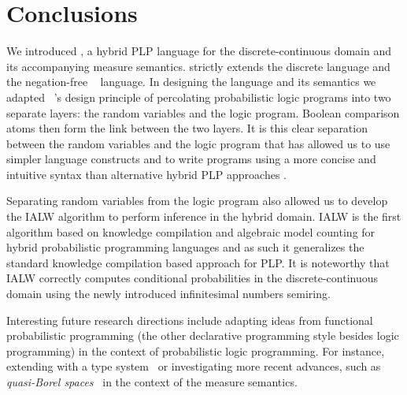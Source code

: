 \section{Conclusions}\label{sec:conclusions}


We introduced \dcproblogsty, a hybrid PLP language for the discrete-continuous domain and its accompanying measure semantics.
\dcproblogsty strictly extends the discrete \problogsty language \citep{de2007problog,fierens2015inference} and the negation-free \dcsty~\citep{gutmann2011magic} language.
In designing the language and its semantics we adapted ~\citet{poole2010probabilistic}'s design principle of percolating probabilistic logic programs into two separate layers: the random variables and the logic program.
 Boolean comparison atoms then form the  link between the two layers.
It is this clear separation between the random variables and the logic program that has allowed us to use simpler language constructs and to write programs using a  more concise and intuitive syntax than alternative hybrid PLP approaches \citep{gutmann2010extending,nitti2016probabilistic,speichert2019learning,azzolini2021semantics}.

Separating random variables from the logic program also allowed us to develop the IALW algorithm to perform inference in the hybrid domain. 
IALW is the first algorithm based on knowledge compilation and algebraic model counting for hybrid probabilistic programming languages
and as such it generalizes the standard knowledge compilation based approach for PLP.
It is noteworthy that IALW correctly computes conditional probabilities in the discrete-continuous domain using the newly introduced infinitesimal numbers semiring.


Interesting future research directions include adapting ideas from functional probabilistic programming (the other declarative programming style besides logic programming) in the context of probabilistic logic programming. For instance, extending \dcproblogsty with a type system~\citep{Schrijvers2008TowardsTP} or investigating more recent advances, such as {\em quasi-Borel spaces}~\citep{heunen2017convenient} in the context of the measure semantics.





